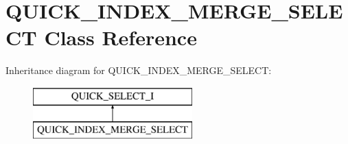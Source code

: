 \hypertarget{classQUICK__INDEX__MERGE__SELECT}{}\section{Q\+U\+I\+C\+K\+\_\+\+I\+N\+D\+E\+X\+\_\+\+M\+E\+R\+G\+E\+\_\+\+S\+E\+L\+E\+CT Class Reference}
\label{classQUICK__INDEX__MERGE__SELECT}
Inheritance diagram for Q\+U\+I\+C\+K\+\_\+\+I\+N\+D\+E\+X\+\_\+\+M\+E\+R\+G\+E\+\_\+\+S\+E\+L\+E\+CT\+:\begin{figure}[H]
\begin{center}
\leavevmode
\includegraphics[height=2.000000cm]{classQUICK__INDEX__MERGE__SELECT}
\end{center}
\end{figure}
